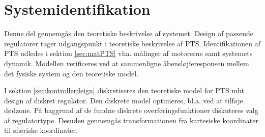\part{Systemidentifikation}
Denne del gennemgås den teoretiske beskrivelse af systemet.
Design af passende regulatorer tager udgangspunkt i teoretiske beskrivelse af PTS. Identifikationen af PTS udledes i sektion \ref{sec:matPTS} vha. målinger af motorerne samt systemets dynamik. 
Modellen verificeres ved at sammenligne åbensløjferesponsen mellem det fysiske system og den teoretiske model.

I sektion \ref{sec:kontrollerdeign} diskretiseres den teoretiske model for PTS mht. design af diskret regulator. Den diskrete model optimeres, bl.a. ved at tilføje dødzone. 
På baggrund af de fundne diskrete overføringsfunktioner diskuteres valg af regulatortype. 
Desuden gennemgås transformationen fra kartesiske koordinater til sfæriske koordinater.
%
%

